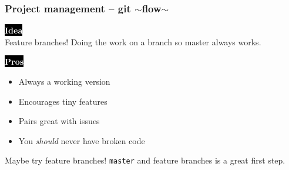 \documentclass{beamer}
\newcommand{\keyword}[1]{\hspace{-1.0em}\colorbox{black}{\textcolor{white}{\textbf{#1}\vphantom{Ep}}}\vspace{0.2em}} %
\begin{document}
\begin{frame}[fragile]
  \frametitle{Project management -- git $\sim$flow$\sim$}

  \keyword{Idea} \\
  Feature branches! Doing the work on a branch so master always works. \\
  \vspace{1em}

  \keyword{Pros}
  \begin{itemize}[<+->]
    \item Always a working version
    \item Encourages tiny features
    \item Pairs great with issues
    \item You \emph{should} never have broken code
  \end{itemize}
  \vspace{1em}

  \pause
  Maybe try feature branches! \texttt{master} and feature branches is a great first step.

\end{frame}
\end{document}
